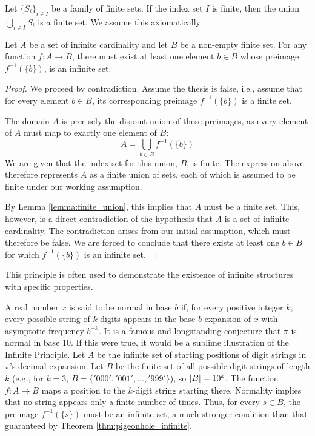 \begin{lemma}\label{lemma:finite_union}
Let $\{S_i\}_{i \in I}$ be a family of finite sets. If the index set $I$ is finite, then the union $\bigcup_{i \in I} S_i$ is a finite set. We assume this axiomatically.
\end{lemma}

\begin{theorem}\label{thm:pigeonhole_infinite}
Let $A$ be a set of infinite cardinality and let $B$ be a non-empty finite set. For any function $f: A \to B$, there must exist at least one element $b \in B$ whose preimage, $f^{-1}(\{b\})$, is an infinite set.
\end{theorem}
\begin{proof}
We proceed by contradiction. Assume the thesis is false, i.e., assume that for every element $b \in B$, its corresponding preimage $f^{-1}(\{b\})$ is a finite set.

The domain $A$ is precisely the disjoint union of these preimages, as every element of $A$ must map to exactly one element of $B$:
$$ A = \bigcup_{b \in B} f^{-1}(\{b\}) $$
We are given that the index set for this union, $B$, is finite. The expression above therefore represents $A$ as a finite union of sets, each of which is assumed to be finite under our working assumption.

By Lemma \ref{lemma:finite_union}, this implies that $A$ must be a finite set. This, however, is a direct contradiction of the hypothesis that $A$ is a set of infinite cardinality. The contradiction arises from our initial assumption, which must therefore be false. We are forced to conclude that there exists at least one $b \in B$ for which $f^{-1}(\{b\})$ is an infinite set.
\end{proof}

This principle is often used to demonstrate the existence of infinite structures with specific properties.

\begin{remark}[Normality of $\pi$]
A real number $x$ is said to be normal in base $b$ if, for every positive integer $k$, every possible string of $k$ digits appears in the base-$b$ expansion of $x$ with asymptotic frequency $b^{-k}$. It is a famous and longstanding conjecture that $\pi$ is normal in base 10. If this were true, it would be a sublime illustration of the Infinite Principle. Let $A$ be the infinite set of starting positions of digit strings in $\pi$'s decimal expansion. Let $B$ be the finite set of all possible digit strings of length $k$ (e.g., for $k=3$, $B = \{'000', '001', \dots, '999'\}$), so $\left| B \right| = 10^k$. The function $f: A \to B$ maps a position to the $k$-digit string starting there. Normality implies that no string appears only a finite number of times. Thus, for every $s \in B$, the preimage $f^{-1}(\{s\})$ must be an infinite set, a much stronger condition than that guaranteed by Theorem \ref{thm:pigeonhole_infinite}.
\end{remark}

